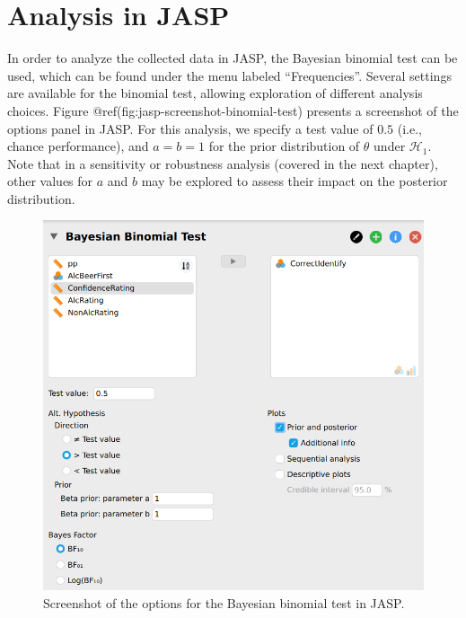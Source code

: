 \documentclass[
  letterpaper,
  DIV=11,
  numbers=noendperiod]{scrreprt}
\begin{document}
\hypertarget{analysis-in-jasp}{%
\section{Analysis in JASP}\label{analysis-in-jasp}}

In order to analyze the collected data in JASP, the Bayesian binomial
test can be used, which can be found under the menu labeled
``Frequencies''. Several settings are available for the binomial test,
allowing exploration of different analysis choices. Figure
@ref(fig:jasp-screenshot-binomial-test) presents a screenshot of the
options panel in JASP. For this analysis, we specify a test value of
\(0.5\) (i.e., chance performance), and \(a = b = 1\) for the prior
distribution of \(\theta\) under \(\mathcal{H}_1\). Note that in a
sensitivity or robustness analysis (covered in the next chapter), other
values for \(a\) and \(b\) may be explored to assess their impact on the
posterior distribution.

\begin{figure}

{\centering \includegraphics[width=1\textwidth,height=\textheight]{Figures/binomTestJASPpanel2022.png}

}

\caption{Screenshot of the options for the Bayesian binomial test in
JASP.}

\end{figure}
\end{document}
